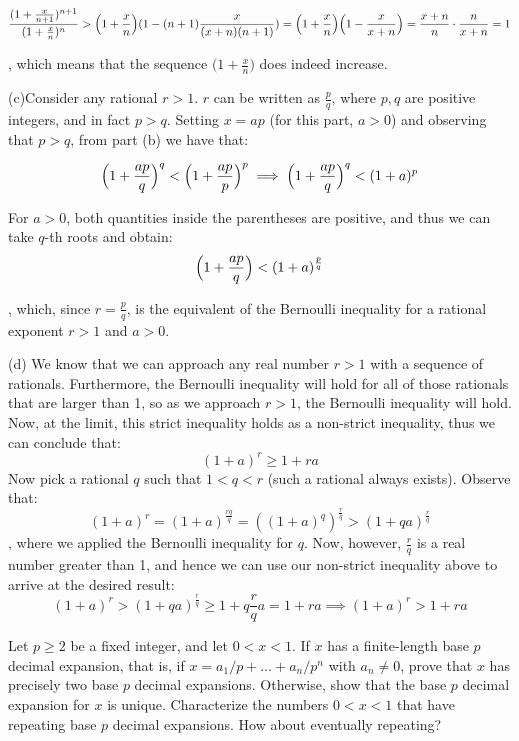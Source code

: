 \begin{solution}
    $$\frac{(1+\frac{x}{n+1})^{n+1}}{(1+\frac{x}{n})^n} > \Bigl(1+\frac{x}{n}\Bigr)(1 - (n+1)\frac{x}{(x+n)(n+1)}) = \Bigl(1+\frac{x}{n}\Bigr)\Bigl(1 - \frac{x}{x+n}\Bigr) = \frac{x+n}{n}\cdot\frac{n}{x+n} = 1$$

    , which means that the sequence $\bigl(1+\frac{x}{n}\bigr)$ does indeed increase.

    (c)Consider any rational $r > 1$. $r$ can be written as $\frac{p}{q}$, where $p, q$ are positive integers, and in fact $p > q$. Setting $x = ap$ (for this part, $a > 0$) and observing that $p > q$, from part (b) we have that:

    $$\Bigl(1 + \frac{ap}{q}\Bigr)^q < \Bigl(1+\frac{ap}{p}\Bigr)^p \implies \Bigl(1 + \frac{ap}{q}\Bigr)^q < (1 + a)^p$$

    For $a > 0$, both quantities inside the parentheses are positive, and thus we can take $q$-th roots and obtain:
    $$\Bigl(1 + \frac{ap}{q}\Bigr) < (1+a)^{\frac{p}{q}}$$

    , which, since $r = \frac{p}{q}$, is the equivalent of the Bernoulli inequality for a rational exponent $r > 1$ and $ a > 0$.

    (d) We know that we can approach any real number $r > 1$ with a sequence of rationals. Furthermore, the Bernoulli inequality will hold for all of those rationals that are larger than 1, so as we approach $r > 1$, the Bernoulli inequality will hold. Now, at the limit, this strict inequality holds as a non-strict inequality, thus we can conclude that:
    $$(1+a)^r \geq 1 + ra$$
    Now pick a rational $q$ such that $1 < q < r$ (such a rational always exists). Observe that:
    $$(1+a)^r = (1+a)^{\frac{rq}{q}} = ((1+a)^q)^{\frac{r}{q}} > (1+qa)^{\frac{r}{q}}$$
    , where we applied the Bernoulli inequality for $q$. Now, however, $\frac{r}{q}$ is a real number greater than 1, and hence we can use our non-strict inequality above to arrive at the desired result:
    $$(1+a)^r > (1+qa)^{\frac{r}{q}} \geq 1 + q\frac{r}{q}a = 1 + ra \implies (1+a)^r > 1 + ra$$
\end{solution}

\begin{exercise}{21}
    Let $p \geq 2$ be a fixed integer, and let $0 < x < 1$. If $x$ has a finite-length base $p$ decimal expansion, that is, if $x = a_1/p + \ldots + a_n/p^n$ with $a_n \neq 0$, prove that $x$ has precisely two base $p$ decimal expansions. Otherwise, show that the base $p$ decimal expansion for $x$ is unique. Characterize the numbers $0 < x < 1$ that have repeating base $p$ decimal expansions. How about eventually repeating?
\end{exercise}

